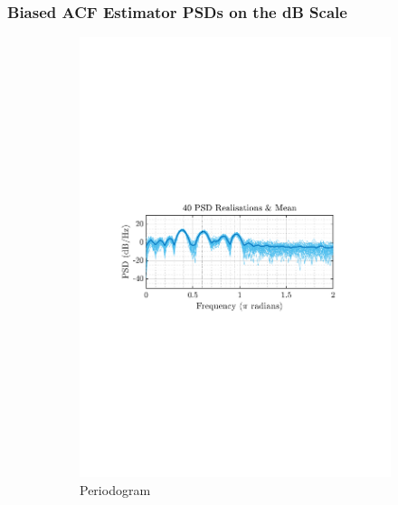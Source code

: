 \documentclass[12pt]{article}
\numberwithin{equation}{section}
\begin{document}
	\subsubsection{Biased ACF Estimator PSDs on the dB Scale}

	\begin{figure}[H]
		\centering
		\begin{subfigure}{0.49\textwidth}
			\centering
			\includegraphics[trim={2.2cm 11.2cm 3.15cm  11.2cm}, clip, width=\textwidth]{../MATLAB/figures/q1_3c_fig01.pdf} 
			\captionsetup{justification=centering}
			\caption{Periodogram}
		\end{subfigure}
		\begin{subfigure}{0.49\textwidth}
			\centering

\end{subfigure}
\end{figure}
\end{document}
